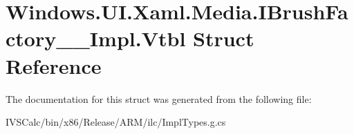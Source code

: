 \hypertarget{struct_windows_1_1_u_i_1_1_xaml_1_1_media_1_1_i_brush_factory_____impl_1_1_vtbl}{}\section{Windows.\+U\+I.\+Xaml.\+Media.\+I\+Brush\+Factory\+\_\+\+\_\+\+Impl.\+Vtbl Struct Reference}
\label{struct_windows_1_1_u_i_1_1_xaml_1_1_media_1_1_i_brush_factory_____impl_1_1_vtbl}


The documentation for this struct was generated from the following file\+:\begin{DoxyCompactItemize}
\item 
I\+V\+S\+Calc/bin/x86/\+Release/\+A\+R\+M/ilc/Impl\+Types.\+g.\+cs\end{DoxyCompactItemize}
